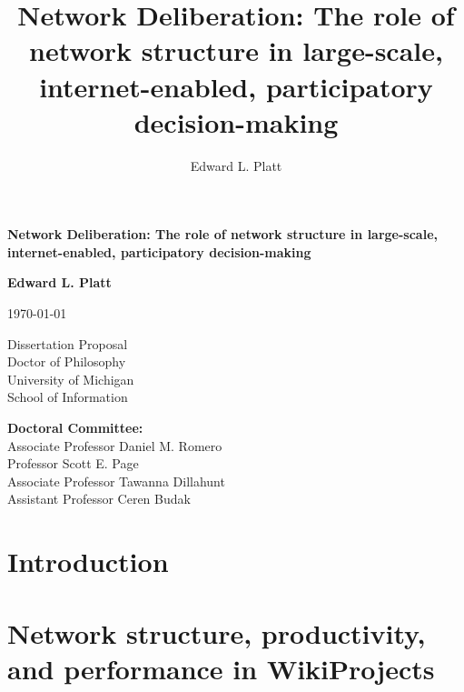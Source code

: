 \documentclass{report}
\author{Edward L. Platt}
\title{Network Deliberation: The role of network structure in large-scale, internet-enabled, participatory decision-making}
\newcommand{\+}{\phantom{-}}
\begin{document}
\begin{titlepage}
   \begin{center}
       \vspace*{1cm}

       \textbf{\Large Network Deliberation: The role of network structure in large-scale, internet-enabled, participatory decision-making}        
            
       \vspace{1.5cm}

       \textbf{Edward L. Platt}
       
       \today

       \vfill
            
       Dissertation Proposal\\
       Doctor of Philosophy \\
       University of Michigan \\
       School of Information
            
       \vspace{0.8cm}
     
            
   \end{center}
    {\bfseries Doctoral Committee:}\\
    Associate Professor Daniel M. Romero \\
    Professor Scott E. Page \\
    Associate Professor Tawanna Dillahunt \\
    Assistant Professor Ceren Budak
         
\end{titlepage}

%

\tableofcontents

\listoffigures
\listoftables

\chapter{Introduction}
\label{chap:intro}
%

\chapter{Network structure, productivity, and performance in WikiProjects}
\label{chap:wp-prod-perf}
%
\end{document}
